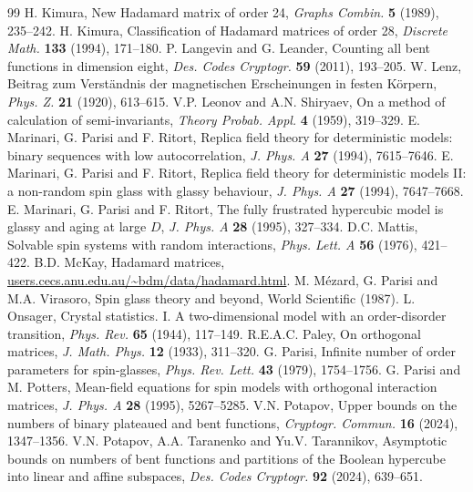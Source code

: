 \documentclass[11pt,a4paper]{article}
\theoremstyle{remark}
\begin{document}
\begin{thebibliography}{99}
H. Kimura, New Hadamard matrix of order 24, \emph{Graphs Combin.} \textbf{5} (1989), 235--242.
H. Kimura, Classification of Hadamard matrices of order 28, \emph{Discrete Math.} \textbf{133} (1994), 171--180.
P. Langevin and G. Leander, Counting all bent functions in dimension eight, \emph{Des. Codes Cryptogr.} \textbf{59} (2011), 193--205.
W. Lenz, Beitrag zum Verst\"andnis der magnetischen Erscheinungen in festen K\"orpern, \emph{Phys. Z.} \textbf{21} (1920), 613--615.
V.P. Leonov and A.N. Shiryaev, On a method of calculation of semi-invariants, \emph{Theory Probab. Appl.} \textbf{4} (1959), 319--329.
E. Marinari, G. Parisi and F. Ritort, Replica field theory for deterministic models: binary sequences with low autocorrelation, \emph{J. Phys. A} \textbf{27} (1994), 7615--7646.
E. Marinari, G. Parisi and F. Ritort, Replica field theory for deterministic models II: a non-random spin glass with glassy behaviour, \emph{J. Phys. A} \textbf{27} (1994), 7647--7668.
E. Marinari, G. Parisi and F. Ritort, The fully frustrated hypercubic model is glassy and aging at large $D$, \emph{J. Phys. A} \textbf{28} (1995), 327--334.
D.C. Mattis, Solvable spin systems with random interactions, \emph{Phys. Lett. A} \textbf{56} (1976), 421--422.
B.D. McKay, Hadamard matrices, {\hypersetup{allcolors=black}\href{https://users.cecs.anu.edu.au/~bdm/data/hadamard.html}{users.cecs.anu.edu.au/\textasciitilde bdm/data/hadamard.html}}.
M. M\'ezard, G. Parisi and M.A. Virasoro, Spin glass theory and beyond, World Scientific (1987).
L. Onsager, Crystal statistics. I. A two-dimensional model with an order-disorder transition, \emph{Phys. Rev.} \textbf{65} (1944), 117--149.
R.E.A.C. Paley, On orthogonal matrices, \emph{J. Math. Phys.} \textbf{12} (1933), 311--320.
G. Parisi, Infinite number of order parameters for spin-glasses, \emph{Phys. Rev. Lett.} \textbf{43} (1979), 1754--1756.
G. Parisi and M. Potters, Mean-field equations for spin models with orthogonal interaction matrices, \emph{J. Phys. A} \textbf{28} (1995), 5267--5285.
V.N. Potapov, Upper bounds on the numbers of binary plateaued and bent functions, \emph{Cryptogr. Commun.} \textbf{16} (2024), 1347--1356.
V.N. Potapov, A.A. Taranenko and Yu.V. Tarannikov, Asymptotic bounds on numbers of bent functions and partitions of the Boolean hypercube into linear and affine subspaces, \emph{Des. Codes Cryptogr.} \textbf{92} (2024), 639--651.

\end{thebibliography}
\end{document}
